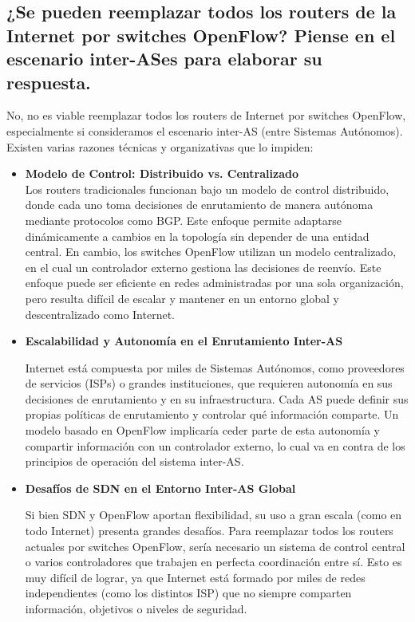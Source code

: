 \documentclass[titlepage,a4paper]{article}
\begin{document}
    \subsection{¿Se pueden reemplazar todos los routers de la Internet por switches OpenFlow? Piense en el escenario inter-ASes para elaborar su respuesta.}

    No, no es viable reemplazar todos los routers de Internet por switches OpenFlow, especialmente si consideramos el escenario inter-AS (entre Sistemas Autónomos). Existen varias razones técnicas y organizativas que lo impiden:
    
    \begin{itemize}
        \item \textbf{Modelo de Control: Distribuido vs. Centralizado}
        \\ Los routers tradicionales funcionan bajo un modelo de control distribuido, donde cada uno toma decisiones de enrutamiento de manera autónoma mediante protocolos como BGP. Este enfoque permite adaptarse dinámicamente a cambios en la topología sin depender de una entidad central. En cambio, los switches OpenFlow utilizan un modelo centralizado, en el cual un controlador externo gestiona las decisiones de reenvío. Este enfoque puede ser eficiente en redes administradas por una sola organización, pero resulta difícil de escalar y mantener en un entorno global y descentralizado como Internet.
        
        \item \textbf{Escalabilidad y Autonomía en el Enrutamiento Inter-AS}

        Internet está compuesta por miles de Sistemas Autónomos, como proveedores de servicios (ISPs) o grandes instituciones, que requieren autonomía en sus decisiones de enrutamiento y en su infraestructura. Cada AS puede definir sus propias políticas de enrutamiento y controlar qué información comparte. Un modelo basado en OpenFlow implicaría ceder parte de esta autonomía y compartir información con un controlador externo, lo cual va en contra de los principios de operación del sistema inter-AS.

        \item \textbf{Desafíos de SDN en el Entorno Inter-AS Global}

        Si bien SDN y OpenFlow aportan flexibilidad, su uso a gran escala (como en todo Internet) presenta grandes desafíos. Para reemplazar todos los routers actuales por switches OpenFlow, sería necesario un sistema de control central o varios controladores que trabajen en perfecta coordinación entre sí. Esto es muy difícil de lograr, ya que Internet está formado por miles de redes independientes (como los distintos ISP) que no siempre comparten información, objetivos o niveles de seguridad.
        
        
    \end{itemize}
    
\end{document}
